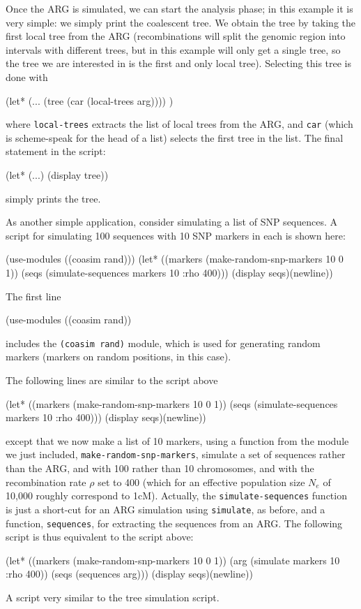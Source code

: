 \documentclass{manual}
\begin{document}
Once the ARG is simulated, we can start the analysis phase; in this
example it is very simple: we simply print the coalescent tree.  We
obtain the tree by taking the first local tree from the ARG
(recombinations will split the genomic region into intervals with
different trees, but in this example will only get a single tree, so
the tree we are interested in is the first and only local tree).
Selecting this tree is done with
\begin{code}
(let* (...
       (tree (car (local-trees arg))))
  )
\end{code}
where \texttt{local-trees} extracts the list of local trees from the
ARG, and \texttt{car} (which is scheme-speak for the head of a list)
selects the first tree in the list.  The final statement in the script:
\begin{code}
(let* (...)
  (display tree))
\end{code}
simply prints the tree.


As another simple application, consider simulating a list of SNP
sequences.  A script for simulating 100 sequences with 10 SNP markers
in each is shown here:
\begin{code}
(use-modules ((coasim rand)))
(let* ((markers (make-random-snp-markers 10 0 1))
       (seqs (simulate-sequences markers 10 :rho 400)))
  (display seqs)(newline))
\end{code}

The first line
\begin{code}
(use-modules ((coasim rand))
\end{code}
includes the \texttt{(coasim rand)} module, which is used for
generating random markers (markers on random positions, in this case).

The following lines are similar to the script above
\begin{code}
(let* ((markers (make-random-snp-markers 10 0 1))
       (seqs (simulate-sequences markers 10 :rho 400)))
  (display seqs)(newline))
\end{code}
except that we now make a list of 10 markers, using a function from
the module we just included, \texttt{make-random-snp-markers},
simulate a set of sequences rather than the ARG, and with 100 rather
than 10 chromosomes, and with the recombination rate $\rho$ set to 400
(which for an effective population size $N_e$ of 10,000 roughly
correspond to 1cM).  Actually, the \texttt{simulate-sequences}
function is just a short-cut for an ARG simulation using
\texttt{simulate}, as before, and a function, \texttt{sequences}, for
extracting the sequences from an ARG.  The following script is thus
equivalent to the script above:
\begin{code}
(let* ((markers (make-random-snp-markers 10 0 1))
       (arg (simulate markers 10 :rho 400))
       (seqs (sequences arg)))
  (display seqs)(newline))
\end{code}
A script very similar to the tree simulation script.
\end{document}
